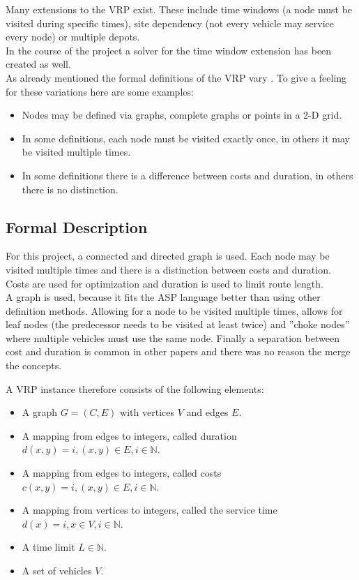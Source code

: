 \documentclass[12pt, letterpaper]{article}
\begin{document}
Many extensions to the VRP exist. These include time windows (a node must be visited during specific times), site dependency (not every vehicle may service every node) or multiple depots.\\
In the course of the project a solver for the time window extension has been created as well.\\

As already mentioned the formal definitions of the VRP vary \cite{survey} \cite{vrptw} \cite{complete}. To give a feeling for these variations here are some examples:
\begin{itemize}
	\item Nodes may be defined via graphs, complete graphs or points in a 2-D grid.
	\item In some definitions, each node must be visited exactly once, in others it may be visited multiple times.
	\item In some definitions there is a difference between costs and duration, in others there is no distinction.
\end{itemize}

\subsection{Formal Description}
For this project, a connected and directed graph is used. Each node may be visited multiple times and there is a distinction between costs and duration. Costs are used for optimization and duration is used to limit route length.\\
A graph is used, because it fits the ASP language better than using other definition methods. Allowing for a node to be visited multiple times, allows for leaf nodes (the predecessor needs to be visited at least twice) and ''choke nodes'' where multiple vehicles must use the same node. Finally a separation between cost and duration is common in other papers and there was no reason the merge the concepts.

A VRP instance therefore consists of the following elements:
\begin{itemize}
	\item A graph $G = (C,E)$ with vertices $V$ and edges $E$.
	\item A mapping from edges to integers, called duration $d(x,y) = i, (x,y) \in E, i \in \mathbb{N}$.
	\item A mapping from edges to integers, called costs $c(x,y) = i, (x,y) \in E, i \in \mathbb{N}$.
	\item A mapping from vertices to integers, called the service time $d(x) = i, x \in V, i \in \mathbb{N}$.
	\item A time limit $L \in \mathbb{N}$.
	\item A set of vehicles $V$.
\end{itemize}
\end{document}
